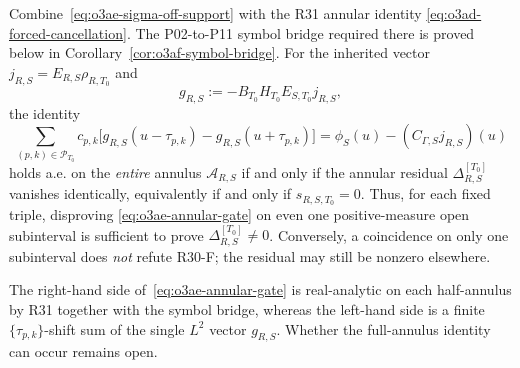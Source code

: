 \begin{remark}
\label{rem:o3ae-gap}
Combine~\eqref{eq:o3ae-sigma-off-support} with the R31 annular identity
\eqref{eq:o3ad-forced-cancellation}.  The P02-to-P11 symbol bridge required there is
proved below in Corollary~\ref{cor:o3af-symbol-bridge}.  For the inherited vector
\(j_{R,S}=E_{R,S}\rho_{R,T_0}\) and
\[
 g_{R,S}:=-B_{T_0}H_{T_0}E_{S,T_0}j_{R,S},
\]
the identity
\[
 \sum_{(p,k)\in\mathcal P_{T_0}}c_{p,k}
 \bigl[g_{R,S}(u-\tau_{p,k})-g_{R,S}(u+\tau_{p,k})\bigr]
 =\phi_S(u)-(C_{\Gamma,S}j_{R,S})(u)
\tag{O3AE.4}\label{eq:o3ae-annular-gate}
\]
holds a.e. on the \emph{entire} annulus \(\mathcal A_{R,S}\) if and only if the
annular residual \(\Delta_{R,S}^{[T_0]}\) vanishes identically, equivalently if and only
if \(s_{R,S,T_0}=0\).  Thus, for each fixed triple, disproving
\eqref{eq:o3ae-annular-gate} on even one positive-measure open subinterval is sufficient
to prove \(\Delta_{R,S}^{[T_0]}\ne0\).  Conversely, a coincidence on only one
subinterval does \emph{not} refute R30-F; the residual may still be nonzero elsewhere.

The right-hand side of~\eqref{eq:o3ae-annular-gate} is real-analytic on each half-annulus
by R31 together with the symbol bridge, whereas the left-hand side is a finite
\(\{\tau_{p,k}\}\)-shift sum of the single \(L^2\) vector \(g_{R,S}\).  Whether the
full-annulus identity can occur remains open.
\end{remark}

